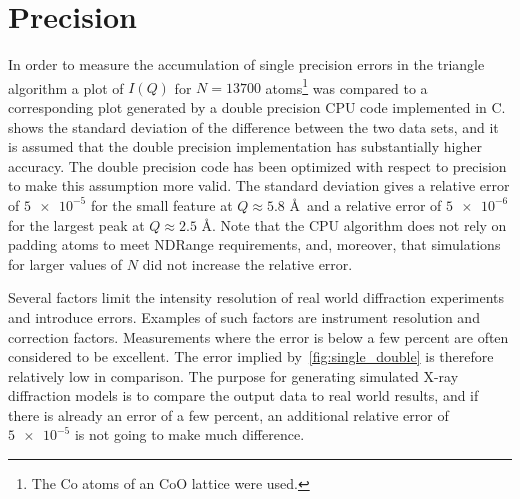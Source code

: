 \documentclass[11pt,twoside]{report}
\newcommand{\chem}[1]{\ensuremath{\mathrm{#1}}}
\begin{document}
\section{Precision}
In order to measure the accumulation of single precision errors in the triangle algorithm a plot of $I(Q)$ for $N = 13700$ atoms\footnote{The \chem{Co} atoms of an \chem{CoO} lattice were used.} was compared to a corresponding plot generated by a double precision CPU code implemented in C.  shows the standard deviation of the difference between the two data sets, and it is assumed that the double precision  implementation has substantially higher accuracy. The double precision code has been optimized with respect to precision to make this assumption more valid.  The standard deviation gives a relative error of $\num{5e-5}$ for the small feature at $Q \approx 5.8$ \AA~and a relative error of  $\num{5e-6}$ for the largest peak at $Q \approx 2.5$ \AA. Note that the CPU algorithm does not rely on padding atoms to meet NDRange requirements, and, moreover, that simulations for larger values of $N$ did not increase the relative error.

\indent Several factors limit the intensity resolution of real world diffraction experiments and introduce errors. Examples of such factors are instrument resolution and  correction factors. Measurements where the error is below a few percent are often considered to be excellent. The error implied by~\cref{fig:single_double} is therefore relatively low in comparison. The purpose for generating simulated X-ray diffraction models is to compare the output data to real world results, and if there is already an error of a few percent, an additional relative error of $\num{5e-5}$ is not going to make much difference.     
\end{document}
